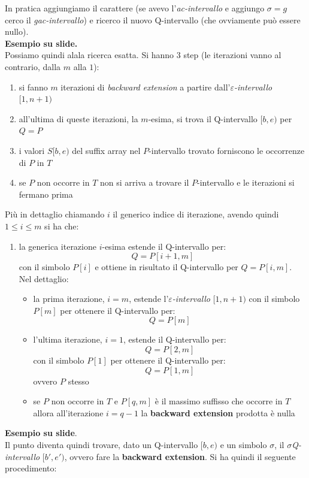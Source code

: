 \documentclass[a4paper,12pt, oneside]{book}
\begin{document}
In pratica aggiungiamo il carattere (se avevo l'\textit{ac-intervallo} e
aggiungo $\sigma=g$ cerco il \textit{gac-intervallo}) e ricerco il nuovo
Q-intervallo (che ovviamente può essere nullo).\\
\textbf{Esempio su slide.}\\
Possiamo quindi alala ricerca esatta. Si hanno 3 step (le iterazioni vanno al
contrario, dalla $m$ alla $1$):
\begin{enumerate}
  \item si fanno $m$ iterazioni di \textit{backward extension} a partire
  dall'\textit{$\varepsilon$-intervallo} $[1,n+1)$
  \item all'ultima di queste iterazioni, la $m$-esima, si trova il Q-intervallo
  $[b,e)$ per $Q=P$
  \item i valori $S[b,e)$ del suffix array nel $P$-intervallo trovato forniscono
  le occorrenze di $P$ in $T$
  \item se $P$ non occorre in $T$ non si arriva a trovare il $P$-intervallo e le
  iterazioni si fermano prima
\end{enumerate}
Più in dettaglio chiamando $i$ il generico indice di iterazione, avendo quindi
$1\leq i\leq m$ si ha che:
\begin{enumerate}
  \item la generica iterazione $i$-esima estende il Q-intervallo per:
  \[Q=P[i+1,m]\]
  con il simbolo $P[i]$ e ottiene in risultato il Q-intervallo per $Q=P[i,m]$.\\
  Nel dettaglio:
  \begin{itemize}
    \item la prima iterazione, $i=m$, estende
    l'\textit{$\varepsilon$-intervallo} $[1,n+1)$ con il simbolo $P[m]$ per
    ottenere il Q-intervallo per:
    \[Q=P[m]\]
    \item l'ultima iterazione, $i=1$, estende il Q-intervallo per:
    \[Q=P[2,m]\]
    con il simbolo $P[1]$ per ottenere il Q-intervallo per:
    \[Q=P[1,m]\]
    ovvero $P$ stesso
    \item se $P$ non occorre in $T$ e $P[q,m]$ è il massimo suffisso che occorre
    in $T$ allora all'iterazione $i=q-1$ la \textbf{backward extension} prodotta
    è nulla
  \end{itemize}
\end{enumerate}
\textbf{Esempio su slide}.\\
Il punto diventa quindi trovare, dato un Q-intervallo $[b,e)$ e un simbolo
$\sigma$, il \textit{$\sigma$Q-intervallo} $[b',e')$, ovvero fare la
\textbf{backward extension}. Si ha quindi il seguente procedimento:
\end{document}
